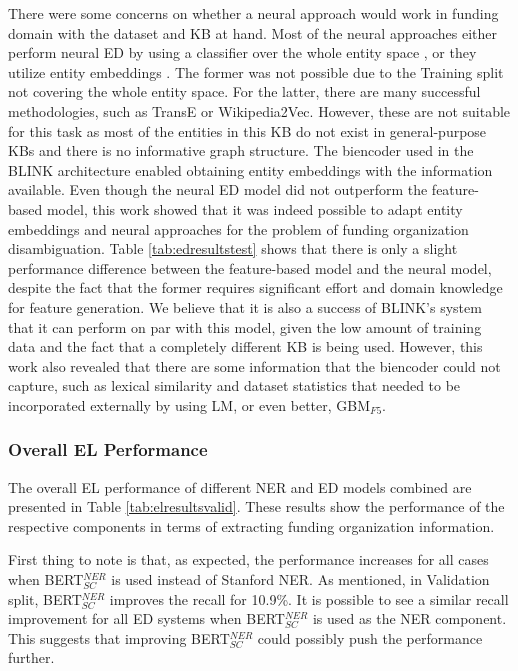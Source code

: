 \documentclass{report}
\theoremstyle{definition}
\theoremstyle{remark}
\begin{document}
There were some concerns on whether a neural approach would work in funding domain with the dataset and KB at hand. Most of the neural approaches either perform neural ED by using a classifier over the whole entity space \cite{bertEL}, or they utilize entity embeddings \cite{scalablezeroshot,dca,googleintern}. The former was not possible due to the Training split not covering the whole entity space. For the latter, there are many successful methodologies, such as TransE or Wikipedia2Vec. However, these are not suitable for this task as most of the entities in this KB do not exist in general-purpose KBs and there is no informative graph structure. The biencoder used in the BLINK architecture enabled obtaining entity embeddings with the information available. Even though the neural ED model did not outperform the feature-based model, this work showed that it was indeed possible to adapt entity embeddings and neural approaches for the problem of funding organization disambiguation. Table \ref{tab:edresultstest} shows that there is only a slight performance difference between the feature-based model and the neural model, despite the fact that the former requires significant effort and domain knowledge for feature generation. We believe that it is also a success of BLINK's system that it can perform on par with this model, given the low amount of training data and the fact that a completely different KB is being used. However, this work also revealed that there are some information that the biencoder could not capture, such as lexical similarity and dataset statistics that needed to be incorporated externally by using LM, or even better, GBM$_{F5}$.

\subsubsection{Overall EL Performance}
The overall EL performance of different NER and ED models combined are presented in Table \ref{tab:elresultsvalid}. These results show the performance of the respective components in terms of extracting funding organization information.

First thing to note is that, as expected, the performance increases for all cases when BERT$_{SC}^{NER}$ is used instead of Stanford NER. As mentioned, in Validation split, BERT$_{SC}^{NER}$ improves the recall for 10.9\%. It is possible to see a similar recall improvement for all ED systems when BERT$_{SC}^{NER}$ is used as the NER component. This suggests that improving BERT$_{SC}^{NER}$ could possibly push the performance further. 
\end{document}
